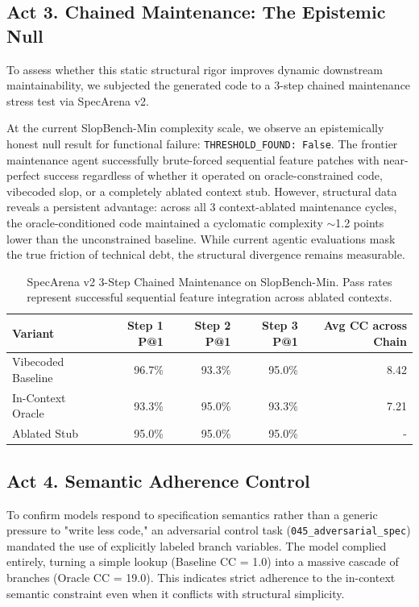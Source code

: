 \documentclass[11pt]{article}
\begin{document}
\subsection{Act 3. Chained Maintenance: The Epistemic Null}

To assess whether this static structural rigor improves dynamic downstream maintainability, we subjected the generated code to a 3-step chained maintenance stress test via SpecArena v2. 

At the current SlopBench-Min complexity scale, we observe an epistemically honest null result for functional failure: \texttt{THRESHOLD\_FOUND: False}. The frontier maintenance agent successfully brute-forced sequential feature patches with near-perfect success regardless of whether it operated on oracle-constrained code, vibecoded slop, or a completely ablated context stub. However, structural data reveals a persistent advantage: across all 3 context-ablated maintenance cycles, the oracle-conditioned code maintained a cyclomatic complexity $\sim$1.2 points lower than the unconstrained baseline. While current agentic evaluations mask the true friction of technical debt, the structural divergence remains measurable.

\vspace{0.1in}

\begin{table}[h]
\centering
\caption{SpecArena v2 3-Step Chained Maintenance on SlopBench-Min. Pass rates represent successful sequential feature integration across ablated contexts.}
\label{tab:chained-maintenance}
\begin{tabular}{lrrrr}
\hline
Variant & Step 1 P@1 & Step 2 P@1 & Step 3 P@1 & Avg CC across Chain \\
\hline
Vibecoded Baseline & 96.7\% & 93.3\% & 95.0\% & 8.42 \\
In-Context Oracle & 93.3\% & 95.0\% & 93.3\% & 7.21 \\
Ablated Stub & 95.0\% & 95.0\% & 95.0\% & - \\
\hline
\end{tabular}
\end{table}

\subsection{Act 4. Semantic Adherence Control}

To confirm models respond to specification semantics rather than a generic pressure to "write less code," an adversarial control task (\texttt{045\_adversarial\_spec}) mandated the use of explicitly labeled branch variables. The model complied entirely, turning a simple lookup (Baseline CC = 1.0) into a massive cascade of branches (Oracle CC = 19.0). This indicates strict adherence to the in-context semantic constraint even when it conflicts with structural simplicity.
\end{document}
